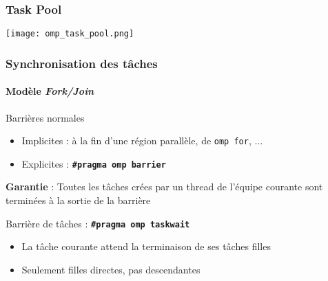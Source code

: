 \documentclass{beamer}
\begin{document}

\begin{frame}
  \frametitle{\og Task Pool\fg{}}

  \texttt{[image: omp\_task\_pool.png]}
\end{frame}



\begin{frame}
  \frametitle{Synchronisation des tâches}
  \framesubtitle{Modèle \emph{Fork/Join}}
  

  \begin{block}{Barrières \og normales\fg{}}
    \begin{itemize}
    \item Implicites : à la fin d'une région parallèle, de \texttt{omp for}, ...
    \item Explicites : \texttt{\bf \#pragma omp barrier}
    \end{itemize}

    \medskip
    
    \textbf{Garantie} : Toutes les tâches crées par un thread de l'équipe courante sont
    terminées à la sortie de la barrière
  \end{block}
  
  \bigskip
  
  \begin{exampleblock}{Barrière de tâches : \texttt{\bf \#pragma omp taskwait}}
    \begin{itemize}
    \item La tâche courante attend la terminaison de ses tâches \alert{filles}
    \item Seulement filles directes, pas descendantes
    \end{itemize}
  \end{exampleblock}  
\end{frame}

\end{document}
